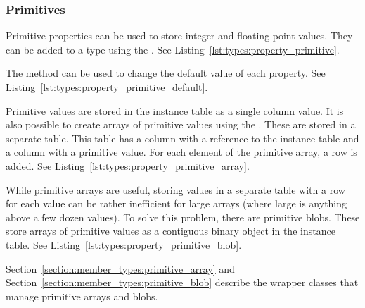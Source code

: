 
\subsubsection{Primitives}
\label{section:types:property_types:primitives}

Primitive properties can be used to store integer and floating point values. They can be added to a type using the . See Listing~\ref{lst:types:property_primitive}.



The  method can be used to change the default value of each property. See Listing~\ref{lst:types:property_primitive_default}.



Primitive values are stored in the instance table as a single column value. It is also possible to create arrays of primitive values using the . These are stored in a separate table. This table has a column with a reference to the instance table and a column with a primitive value. For each element of the primitive array, a row is added. See Listing~\ref{lst:types:property_primitive_array}.



While primitive arrays are useful, storing values in a separate table with a row for each value can be rather inefficient for large arrays (where large is anything above a few dozen values). To solve this problem, there are primitive blobs. These store arrays of primitive values as a contiguous binary object in the instance table. See Listing~\ref{lst:types:property_primitive_blob}.



Section~\ref{section:member_types:primitive_array} and Section~\ref{section:member_types:primitive_blob} describe the wrapper classes that manage primitive arrays and blobs.

